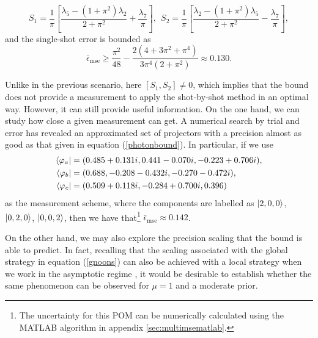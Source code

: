 \begin{equation}
S_1 =  \frac{1}{\pi}\left[ \frac{\lambda_5-(1+\pi^2)\lambda_2}{2+\pi^2}  +\frac{\lambda_7}{\pi} \right],~~S_2 = \frac{1}{\pi}\left[ \frac{\lambda_2 -(1+\pi^2) \lambda_5}{2+\pi^2}  -\frac{\lambda_7}{\pi} \right],
\end{equation}
and the single-shot error is bounded as
\begin{equation}
\bar{\epsilon}_{\mathrm{mse}} \geqslant \frac{\pi^2}{48} - \frac{2\left(4 + 3\pi^2 + \pi^4\right)}{3\pi^4\left(2 + \pi^2\right)} \approx 0.130.
\label{photonbound}
\end{equation}

Unlike in the previous scenario, here $[S_1, S_2] \neq 0$, which implies that the bound does not provide a measurement to apply the shot-by-shot method in an optimal way. However, it can still provide useful information. On the one hand, we can study how close a given measurement can get. A numerical search by trial and error has revealed an approximated set of projectors with a precision almost as good as that given in equation (\ref{photonbound}). In particular, if we use 
\begin{align}
\bra{\varphi_a}&= (0.485 + 0.131 i, 0.441 - 0.070 i, -0.223 + 0.706 i),
\nonumber \\
\bra{\varphi_b} &= (0.688, - 0.208 - 0.432 i, -0.270 - 0.472 i),\nonumber \\
\bra{\varphi_c}&= (0.509 + 0.118 i, -0.284 + 0.700 i, 0.396 )
\end{align}
as the measurement scheme, where the components are labelled as $\ket{2,0,0}$, $\ket{0,2,0}$, $\ket{0,0,2}$, then we have that\footnote{The uncertainty for this POM can be numerically calculated using the MATLAB algorithm in appendix \ref{sec:multimsematlab}.} $\bar{\epsilon}_{\mathrm{mse}} \approx 0.142$. 

On the other hand, we may also explore the precision scaling that the bound is able to predict. In fact, recalling that the scaling associated with the global strategy in equation (\ref{gnoons}) can also be achieved with a local strategy when we work in the asymptotic regime \cite{knott2016local}, it would be desirable to establish whether the same phenomenon can be observed for $\mu = 1$ and a moderate prior.

